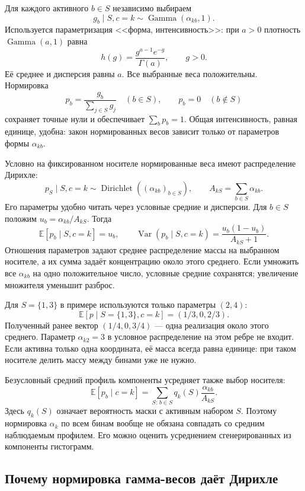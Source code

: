 \documentclass[11pt,a4paper]{article}
\newcommand{\E}{\mathbb E}
\begin{document}
Для каждого активного $b\in S$ независимо выбираем
\[
 g_b\mid S,c=k\sim\operatorname{Gamma}(\alpha_{kb},1).
\]
Используется параметризация <<форма, интенсивность>>: при $a>0$
плотность $\operatorname{Gamma}(a,1)$ равна
\[
 h(g)=\frac{g^{a-1}e^{-g}}{\Gamma(a)},\qquad g>0.
\]
Её среднее и дисперсия равны $a$.
Все выбранные веса положительны. Нормировка
\[
 p_b=\frac{g_b}{\sum_{j\in S}g_j}\quad(b\in S),\qquad
 p_b=0\quad(b\notin S)
\]
сохраняет точные нули и обеспечивает $\sum_bp_b=1$.
Общая интенсивность, равная единице, удобна: закон нормированных весов
зависит только от параметров формы $\alpha_{kb}$.

Условно на фиксированном носителе нормированные веса имеют распределение
Дирихле:
\[
 p_S\mid S,c=k\sim\operatorname{Dirichlet}((\alpha_{kb})_{b\in S}),
 \qquad A_{kS}=\sum_{b\in S}\alpha_{kb}.
\]
Его параметры удобно читать через условные средние и дисперсии.
Для $b\in S$ положим $u_b=\alpha_{kb}/A_{kS}$. Тогда
\[
 \E[p_b\mid S,c=k]=u_b,\qquad
 \operatorname{Var}(p_b\mid S,c=k)=\frac{u_b(1-u_b)}{A_{kS}+1}.
\]
Отношения параметров задают среднее распределение массы на выбранном
носителе, а их сумма задаёт концентрацию около этого среднего.
Если умножить все $\alpha_{kb}$ на одно положительное число,
условные средние сохранятся; увеличение множителя уменьшит разброс.

Для $S=\{1,3\}$ в примере используются только параметры $(2,4)$:
\[
 \E[p\mid S=\{1,3\},c=k]=(1/3,0,2/3).
\]
Полученный ранее вектор $(1/4,0,3/4)$ --- одна реализация около этого
среднего. Параметр $\alpha_{k2}=3$ в условное распределение на этом ребре
не входит. Если активна только одна координата, её масса всегда равна
единице: при таком носителе делить массу между бинами уже не нужно.

Безусловный средний профиль компоненты усредняет также выбор носителя:
\[
 \E[p_b\mid c=k]=
 \sum_{S:\,b\in S}q_k(S)\frac{\alpha_{kb}}{A_{kS}}.
\]
Здесь $q_k(S)$ означает вероятность маски с активным набором $S$.
Поэтому нормировка $\alpha_k$ по всем бинам вообще не обязана совпадать
со средним наблюдаемым профилем. Его можно оценить усреднением
сгенерированных из компоненты гистограмм.

\subsection{Почему нормировка гамма-весов даёт Дирихле}
\end{document}
